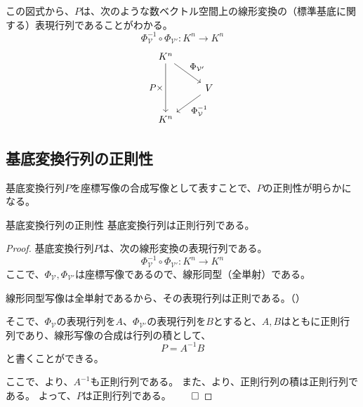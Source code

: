 \documentclass[../../../topic_linear-algebra]{subfiles}
\begin{document}
この図式から、$P$は、次のような数ベクトル空間上の線形変換の（標準基底に関する）表現行列であることがわかる。
\begin{equation*}
  \Phi_{\mathcal{V}}^{-1} \circ \Phi_{\mathcal{V}'} \colon K^n \to K^n
\end{equation*}
\begin{equation*}
  \begin{tikzcd}[every label/.append style = {font = \small}]
    K^n \arrow[dd, "P\times"'] \arrow[rd,"{\Phi_{\mathcal{V}'}}"] & \\
    & V \arrow[ld,"{\Phi_{\mathcal{V}}^{-1}}"] \\
    K^n &
  \end{tikzcd}
\end{equation*}

\subsection{基底変換行列の正則性}

基底変換行列$P$を座標写像の合成写像として表すことで、$P$の正則性が明らかになる。

\begin{theorem*}{基底変換行列の正則性}
  基底変換行列は正則行列である。
\end{theorem*}

\begin{proof}
  基底変換行列$P$は、次の線形変換の表現行列である。
  \begin{equation*}
    \Phi_{\mathcal{V}}^{-1} \circ \Phi_{\mathcal{V}'} \colon K^n \to K^n
  \end{equation*}
  ここで、$\Phi_{\mathcal{V}}, \Phi_{\mathcal{V}'}$は座標写像であるので、線形同型（全単射）である。
  
  \br
  
  線形同型写像は全単射であるから、その表現行列は正則である。（）
  
  そこで、$\Phi_{\mathcal{V}}$の表現行列を$A$、$\Phi_{\mathcal{V}'}$の表現行列を$B$とすると、$A,B$はともに正則行列であり、線形写像の合成は行列の積として、
  \begin{equation*}
    P = A^{-1} B
  \end{equation*}
  と書くことができる。
  
  \br
  
  ここで、より、$A^{-1}$も正則行列である。
  また、より、正則行列の積は正則行列である。
  よって、$P$は正則行列である。$\qed$
\end{proof}
\end{document}
